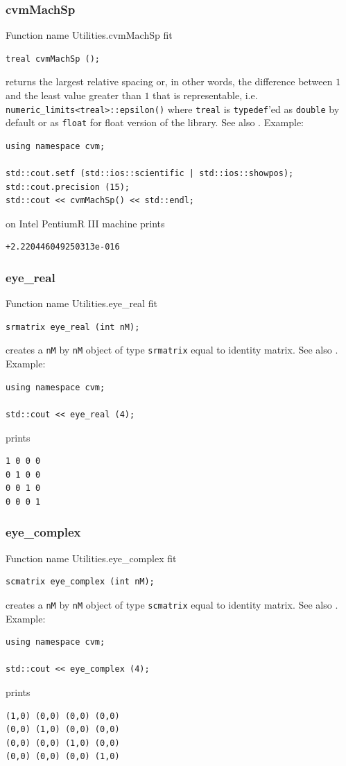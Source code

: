 \subsubsection{cvmMachSp}
Function%
\pdfdest name {Utilities.cvmMachSp} fit
\begin{verbatim}
treal cvmMachSp ();
\end{verbatim}
returns the largest relative spacing or, in other words,
the difference between $1$ and the least value greater 
than $1$ that is representable,
i.e. \verb"numeric_limits<treal>::epsilon()"
where \verb"treal" is \verb"typedef"'ed as \verb"double"
by default or as \verb"float" for float version of the library.
See also .
Example:
\begin{Verbatim}
using namespace cvm;

std::cout.setf (std::ios::scientific | std::ios::showpos);
std::cout.precision (15);
std::cout << cvmMachSp() << std::endl;
\end{Verbatim}
on Intel Pentium\textcircled{\scriptsize{R}} III machine prints
\begin{Verbatim}
+2.220446049250313e-016
\end{Verbatim}
\newpage




\subsubsection{eye\_real}
Function%
\pdfdest name {Utilities.eye_real} fit
\begin{verbatim}
srmatrix eye_real (int nM);
\end{verbatim}
creates a \verb"nM" by \verb"nM" object of type 
\verb"srmatrix" 
equal to identity matrix.
See also .
Example:
\begin{Verbatim}
using namespace cvm;

std::cout << eye_real (4);
\end{Verbatim}
prints
\begin{Verbatim}
1 0 0 0
0 1 0 0
0 0 1 0
0 0 0 1
\end{Verbatim}
\newpage



\subsubsection{eye\_complex}
Function%
\pdfdest name {Utilities.eye_complex} fit
\begin{verbatim}
scmatrix eye_complex (int nM);
\end{verbatim}
creates a \verb"nM" by \verb"nM" object of type 
\verb"scmatrix" 
equal to identity matrix.
See also .
Example:
\begin{Verbatim}
using namespace cvm;

std::cout << eye_complex (4);
\end{Verbatim}
prints
\begin{Verbatim}
(1,0) (0,0) (0,0) (0,0)
(0,0) (1,0) (0,0) (0,0)
(0,0) (0,0) (1,0) (0,0)
(0,0) (0,0) (0,0) (1,0)
\end{Verbatim}
\newpage





